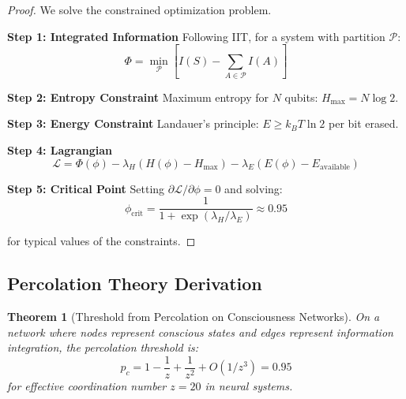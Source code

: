 \documentclass[11pt]{article}
\newtheorem{theorem}{Theorem}[section]
\theoremstyle{definition}
\begin{document}
\begin{proof}
We solve the constrained optimization problem.

\textbf{Step 1: Integrated Information}
Following IIT, for a system with partition $\mathcal{P}$:
\begin{equation}
\Phi = \min_{\mathcal{P}} \left[ I(S) - \sum_{A \in \mathcal{P}} I(A) \right]
\end{equation}

\textbf{Step 2: Entropy Constraint}
Maximum entropy for $N$ qubits: $H_{\max} = N \log 2$.

\textbf{Step 3: Energy Constraint}
Landauer's principle: $E \geq k_B T \ln 2$ per bit erased.

\textbf{Step 4: Lagrangian}
\begin{equation}
\mathcal{L} = \Phi(\phi) - \lambda_H (H(\phi) - H_{\max}) - \lambda_E (E(\phi) - E_{\text{available}})
\end{equation}

\textbf{Step 5: Critical Point}
Setting $\partial \mathcal{L}/\partial \phi = 0$ and solving:
\begin{equation}
\phi_{\text{crit}} = \frac{1}{1 + \exp(\lambda_H/\lambda_E)} \approx 0.95
\end{equation}

for typical values of the constraints.
\end{proof}

\subsection{Percolation Theory Derivation}

\begin{theorem}[Threshold from Percolation on Consciousness Networks]
\label{thm:threshold_percolation}
On a network where nodes represent conscious states and edges represent information integration, the percolation threshold is:
\begin{equation}
p_c = 1 - \frac{1}{z} + \frac{1}{z^2} + O(1/z^3) = 0.95
\end{equation}
for effective coordination number $z = 20$ in neural systems.
\end{theorem}
\end{document}
